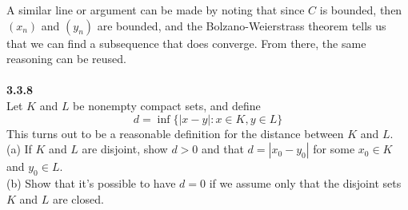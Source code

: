 A similar line or argument can be made by noting that since $C$ is bounded, then $(x_n)$ and $(y_n)$ are bounded,
and the Bolzano-Weierstrass theorem tells us that we can find a subsequence that does converge.
From there, the same reasoning can be reused.
\\~\\



\textbf{3.3.8}
\\

Let $K$ and $L$ be nonempty compact sets, and define
$$
d = \inf\{ |x-y| : x\in K, y\in L \}
$$
This turns out to be a reasonable definition for the distance between $K$ and $L$.
\\

(a) If $K$ and $L$ are disjoint, show $d>0$ and that $d = |x_0 - y_0|$ for some $x_0 \in K$ and $y_0 \in L$.
\\

(b) Show that it's possible to have $d = 0$ if we assume only that the disjoint sets $K$ and $L$ are closed.
\\